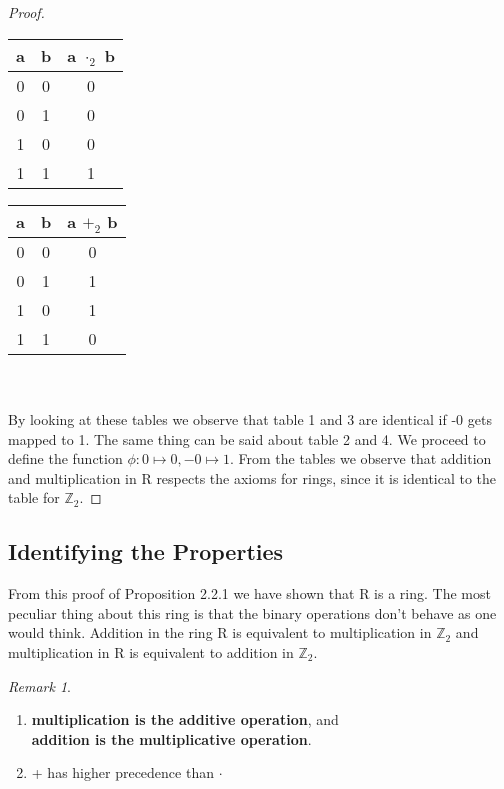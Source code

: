 \documentclass[12pt]{report}
\theoremstyle{definition}
\theoremstyle{remark}
\newtheorem*{remark}{Remark}
\begin{document}
\begin{proof}
\begin{minipage}{0.2\textwidth}
\begin{center}
\begin{tabular}{| c | c || c |}
            a & b & a $\cdot_2$ b \\ \hline
            0 & 0 & 0 \\ \hline
            0 & 1 & 0 \\ \hline
            1 & 0 & 0 \\ \hline
            1 & 1 & 1 \\ \hline
          \end{tabular}
        \end{center}
      \end{minipage}
      \begin{minipage}{0.2\textwidth}
        \begin{center}
          \begin{tabular}{| c | c || c |} \hline
            a & b & a $+_2$ b \\ \hline
            0 & 0 & 0 \\ \hline
            0 & 1 & 1 \\ \hline
            1 & 0 & 1 \\ \hline
            1 & 1 & 0 \\ \hline
          \end{tabular}
        \end{center}
      \end{minipage}\\\\

      By looking at these tables we observe that table 1 and 3 are identical if -0 gets mapped to 1. The same thing can be said about table 2 and 4. We proceed to define the function $\phi: 0 \mapsto 0, -0 \mapsto 1$. From the tables we observe that addition and multiplication in R respects the axioms for rings, since it is identical to the table for $\mathbb{Z}_2$.
    \end{proof}

    \subsection{Identifying the Properties}
    From this proof of Proposition 2.2.1 we have shown that R is a ring. The most peculiar thing about this ring is that the binary operations don't behave as one would think. Addition in the ring R is equivalent to multiplication in $\mathbb{Z}_2$ and multiplication in R is equivalent to addition in $\mathbb{Z}_2$.

    \begin{remark}$\ $
      \begin{enumerate}
        \item \textbf{multiplication is the additive operation}, and\\ \textbf{addition is the multiplicative operation}.
        \item + has higher precedence than $\cdot$
      \end{enumerate}

    \end{remark}
\end{document}
